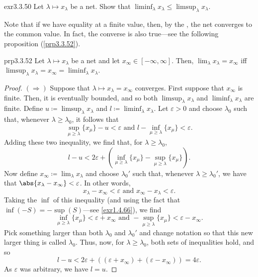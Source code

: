 \begin{exr}{}{exr3.3.50}
Let $\lambda \mapsto x_\lambda$ be a net.  Show that $\liminf _\lambda x_\lambda \leq \limsup _\lambda x_\lambda$.
\begin{rmk}
Note that if we have equality at a finite value, then, by the , the net converges to the common value.  In fact, the converse is also true---see the following proposition (\cref{prp3.3.52}).
\end{rmk}
\end{exr}
\begin{prp}{}{prp3.3.52}
Let $\lambda \mapsto x_\lambda$ be a net and let $x_{\infty}\in [-\infty ,\infty ]$.  Then, $\lim _{\lambda}x_\lambda =x_{\infty}$ iff $\limsup _\lambda x_\lambda =x_{\infty}=\liminf _\lambda x_\lambda$.
\begin{proof}
$(\Rightarrow )$ Suppose that $\lambda \mapsto x_\lambda =x_{\infty}$ converges.  First suppose that $x_{\infty}$ is finite.  Then, it is eventually bounded, and so both $\limsup _\lambda x_\lambda$ and $\liminf _\lambda x_\lambda$ are finite.  Define $u\coloneqq \limsup _\lambda x_\lambda$ and $l\coloneqq \liminf _\lambda x_\lambda$.  Let $\varepsilon >0$ and choose $\lambda _0$ such that, whenever $\lambda \geq \lambda _0$, it follows that
\begin{equation}
\sup _{\mu \geq \lambda}\{ x_\mu \} -u<\varepsilon \text{ and }l-\inf _{\mu \geq \lambda}\{ x_\mu \} <\varepsilon .
\end{equation}
Adding these two inequality, we find that, for $\lambda \geq \lambda _0$,
\begin{equation}
l-u<2\varepsilon +\left( \inf _{\mu\geq \lambda}\{ x_\mu \} -\sup _{\mu \geq \lambda}\{ x_\mu \}\right) .
\end{equation}
Now define $x_\infty \coloneqq \lim _\lambda x_\lambda$ and choose $\lambda _0'$ such that, whenever $\lambda \geq \lambda _0'$, we have that $\abs{x_\lambda -x_\infty}<\varepsilon$.  In other words,
\begin{equation}
x_\lambda -x_\infty <\varepsilon \text{ and }x_\infty -x_\lambda <\varepsilon .
\end{equation}
Taking the $\inf$ of this inequality (and using the fact that $\inf (-S)=-\sup (S)$---see \cref{exr1.4.66}), we find
\begin{equation}
\inf _{\mu \geq \lambda}\{ x_\mu \} <\varepsilon +x_\infty \text{ and }-\sup _{\mu \geq \lambda}\{ x_\mu \} <\varepsilon -x_\infty .
\end{equation}
Pick something larger than both $\lambda _0$ and $\lambda _0'$ and change notation so that this new larger thing is called $\lambda _0$.  Thus, now, for $\lambda \geq \lambda _0$, both sets of inequalities hold, and so
\begin{equation}
l-u<2\varepsilon +\left( (\varepsilon +x_\infty) +(\varepsilon -x_\infty )\right) =4\varepsilon .
\end{equation}
As $\varepsilon$ was arbitrary, we have $l=u$.


\end{proof}
\end{prp}
